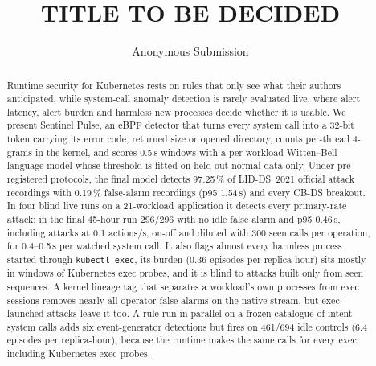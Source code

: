 \documentclass[letterpaper,twocolumn,10pt]{article}
\newcommand{\sys}{Sentinel Pulse\xspace}
\begin{document}
\date{}
\title{\Large \bf TITLE TO BE DECIDED}
\author{{\rm Anonymous Submission}}
\maketitle

\begin{abstract}
Runtime security for Kubernetes rests on rules that only see what their authors anticipated, while system-call anomaly
detection is rarely evaluated live, where alert latency, alert burden and harmless new processes decide whether it is
usable. We present \sys, an eBPF detector that turns every system call into a 32-bit token carrying its error code,
returned size or opened directory, counts per-thread 4-grams in the kernel, and scores 0.5\,s windows with a per-workload
Witten--Bell language model whose threshold is fitted on held-out normal data only. Under pre-registered protocols, the
final model detects 97.25\,\% of LID-DS~2021 official attack recordings with 0.19\,\% false-alarm recordings (p95
1.54\,s) and every CB-DS breakout. In four blind live runs on a 21-workload application it detects every primary-rate
attack; in the final 45-hour run 296/296 with no idle false alarm and p95 0.46\,s, including attacks at 0.1 actions/s,
on-off and diluted with 300 seen calls per operation, for 0.4--0.5\,\textmu s per watched system call. It also flags
almost every harmless process started through \texttt{kubectl exec}, its burden (0.36 episodes per replica-hour) sits
mostly in windows of Kubernetes exec probes, and it is blind to attacks built only from seen sequences. A kernel lineage
tag that separates a workload's own processes from exec sessions removes nearly all operator false alarms on the native
stream, but exec-launched attacks leave it too. A rule run in parallel on a frozen catalogue of intent system calls adds six event-generator detections but fires on 461/694 idle controls (6.4 episodes per replica-hour), because the runtime makes the same calls for every exec, including Kubernetes exec probes.
\end{abstract}













\appendix


\end{document}
